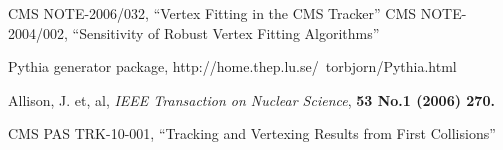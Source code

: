 \begin{thebibliography}{99}

CMS NOTE-2006/032, ``Vertex Fitting in the CMS Tracker''
CMS NOTE-2004/002, ``Sensitivity of Robust Vertex Fitting Algorithms''

Pythia generator package, http://home.thep.lu.se/~torbjorn/Pythia.html

Allison, J. et, al, {\it IEEE Transaction on Nuclear Science}, 
\bf{53 No.1} (2006) 270.

CMS PAS TRK-10-001, ``Tracking and Vertexing Results from First Collisions''

\end{thebibliography}
